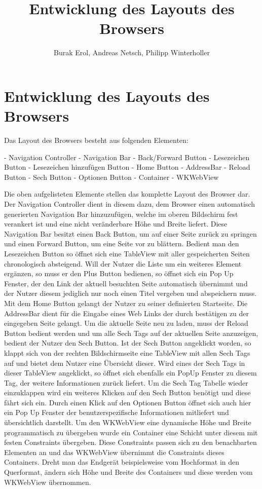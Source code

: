 
\title{Entwicklung des Layouts des Browsers}
\author{Burak Erol, Andreas Netsch, Philipp Winterholler}

\section{Entwicklung des Layouts des Browsers}

Das Layout des Browsers besteht aus folgenden Elementen:

- Navigation Controller
- Navigation Bar
	- Back/Forward Button
	- Lesezeichen Button
	- Lesezeichen hinzufügen Button
	- Home Button
	- AddressBar
	- Reload Button
	- Sech Button
	- Optionen Button
- Container
- WKWebView

Die oben aufgelisteten Elemente stellen das komplette Layout des Browser dar. Der Navigation Controller dient in diesem dazu, dem Browser einen automatisch generierten Navigation Bar hinzuzufügen, welche im oberen Bildschirm fest verankert ist und eine nicht veränderbare Höhe und Breite liefert. Diese Navigation Bar besitzt einen Back Button, um auf einer Seite zurück zu springen und einen Forward Button, um eine Seite vor zu blättern. Bedient man den Lesezeichen Button so öffnet sich eine TableView mit aller gespeicherten Seiten chronologisch absteigend. Will der Nutzer die Liste um ein weiteres Element ergänzen, so muss er den Plus Button bedienen, so öffnet sich ein Pop Up Fenster, der den Link der aktuell besuchten Seite automatisch übernimmt und der Nutzer diesem jediglich nur noch einen Titel vergeben und abspeichern muss. Mit dem Home Button gelangt der Nutzer zu seiner definierten Startseite. Die AddressBar dient für die Eingabe eines Web Links der durch bestätigen zu der eingegeben Seite gelangt. Um die aktuelle Seite neu zu laden, muss der Reload Button bedient werden und um alle Sech Tags auf der aktuellen Seite anzuzeigen, bedient der Nutzer den Sech Button. Ist der Sech Button angeklickt worden, so klappt sich von der rechten Bildschirmseite eine TableView mit allen Sech Tags auf und bietet dem Nutzer eine Übersicht dieser. Wird eines der Sech Tags in dieser TableView angeklickt, so öffnet sich ebenfalls ein PopUp Fenster zu diesem Tag, der weitere Informationen zurück liefert. Um die Sech Tag Tabelle wieder einzuklappen wird ein weiteres Klicken auf den Sech Button benötigt und diese fährt sich ein. Durch einen Klick auf den Optionen Button öffnet sich auch hier ein Pop Up Fenster der benutzerspezifische Informationen mitliefert und übersichtlich darstellt. Um den WKWebView eine dynamische Höhe und Breite programmatisch zu übergeben wurde ein Container eine Schicht unter diesem mit festen Constraints übergeben. Diese Constraints passen sich zu den benachbarten Elementen an und das WKWebView übernimmt die Constraints dieses Containers. Dreht man das Endgerät beispielsweise vom Hochformat in den Querformat, ändern sich Höhe und Breite des Containers und diese werden vom WKWebView übernommen.

